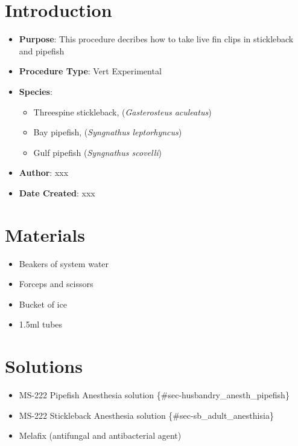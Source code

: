 \documentclass[
  letterpaper,
  DIV=11,
  numbers=noendperiod]{scrreprt}
\providecommand{\tightlist}{%
  \setlength{\itemsep}{0pt}\setlength{\parskip}{0pt}}\usepackage{longtable,booktabs,array}
\begin{document}
\hypertarget{introduction-80}{%
\section{Introduction}\label{introduction-80}}

\begin{itemize}
\tightlist
\item
  \textbf{Purpose}: This procedure decribes how to take live fin clips
  in stickleback and pipefish
\item
  \textbf{Procedure Type}: Vert Experimental
\item
  \textbf{Species}:

  \begin{itemize}
  \tightlist
  \item
    Threespine stickleback, (\emph{Gasterosteus aculeatus})
  \item
    Bay pipefish, (\emph{Syngnathus leptorhyncus})
  \item
    Gulf pipefish (\emph{Syngnathus scovelli})
  \end{itemize}
\item
  \textbf{Author}: xxx
\item
  \textbf{Date Created}: xxx
\end{itemize}

\hypertarget{materials-76}{%
\section{Materials}\label{materials-76}}

\begin{itemize}
\tightlist
\item
  Beakers of system water
\item
  Forceps and scissors
\item
  Bucket of ice
\item
  1.5ml tubes
\end{itemize}

\hypertarget{solutions-68}{%
\section{Solutions}\label{solutions-68}}

\begin{itemize}
\tightlist
\item
  MS-222 Pipefish Anesthesia solution
  \{\#sec-husbandry\_anesth\_pipefish\}
\item
  MS-222 Stickleback Anesthesia solution \{\#sec-sb\_adult\_anesthisia\}
\item
  Melafix (antifungal and antibacterial agent)
\end{itemize}
\end{document}
